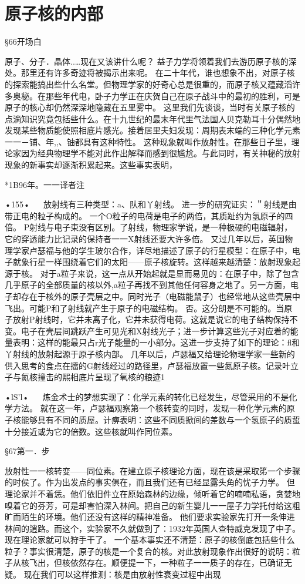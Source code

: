 \chapter{原子核的内部}

§66开场白

原子、分子．晶体..…现在又该讲什么呢？
益子力学将领着我们去游历原子核的深处。那里还有许多奇迹将被揭示出来呢。
在二十年代，谁也想象不出，对原子核的探索能搞出些什么名堂。但物理学家的好奇心总是很重的，而原子核又蕴藏滔许多奥秘。在那些年代电，卧子力学正在庆贺自己在原子战斗中的最初的胜利，可是原子的核心却仍然深深地隐藏在五里雾中。
这里我们先谈谈，当时有关原子核的点滴知识究竟包括些什么。在十九世纪的最末年代里气法国人贝克勒耳十分偶然地发现某些物质能使照相底片感光。接着居里夫妇发现：周期表末端的三种化学元素一一－铺、年,,、铀都具有这种特性。
这种现象就叫作放射性。在那些日子里，理论家因为经典物理学不能对此作出解释而感到很尴尬。与此同时，有关神秘的放射现象的新事实却逐渐积累起来。这些事实表明，

*1B96年。一一译者注

•155•
  
放射线有三种类型：a、队和丫射线。
进一步的研究证实：＂射线是由带正电的粒子构成的。
一个O粒子的电荷是电子的两倍，其质趾约为氢原子的四倍。
P射线与电子束没有区别。了射线，物理家学说，是一种极硬的电磁辐射，它的穿透能力比记录的保持者一一X射线还要大许多倍。
又过几年以后，英国物理学家卢瑟福与他的学生玻尔合作，详尽地描述了原子的行星模型：在原子中，电子就象行星一样围绕着它们的太阳——原子核旋转。这样越来越清楚：放射现象起源于核。
对于a粒子来说，这一点从开始起就是显而易见的：在原子中，除了包含几乎原子的全部质量的核以外,a粒子再找不到其他任何容身之地了。另一方面，电子却存在于核外的原子壳层之中。同时光子（电磁能鼠子）也经常地从这些壳层中飞出。可能P和了射线就产生于原子的电磁结构。
否。这分朗是不可能的。当原子放射P射线时，它并未离子化，它井未获得电荷。这就是说它的电子结构保持不变。电子在壳层间跳跃产生可见光和X射线光子；进一步计算这些光子对应着的能量表明：这样的能最只占r光子能量的一小部分。这进一步支持了如下的理论：fl和丫射线的放射起源于原子核内部。
几年以后，卢瑟福又给理论物理学家一些新的供入思考的食点在擂的G射线经过的路径里，卢瑟福放置一些氮原子核。记录叶立子与氮核撞击的熙相底片呈现了氧核的粮迹1

•lS'l•
  
炼金术士的梦想实现了：化学元素的转化已经发生，尽管采用的不是化学方法。
就在这一年，卢瑟福观察第一个核转变的同时，发现一种化学元素的原子核能够具有不同的质屋。计痹表明：这些不同质掀间的差数与一个氢原子的质蜇十分接近或为它的倍数。这些核就叫作同位素。

§67第一．步

放射性一一核转变——同位素。在建立原子核理论方面，现在该是采取笫一个步骤的时侯了。作为出发点的事实俱在，而且我们还有已经显露头角的忧子力学。
但理论家并不着恁。他们依旧件立在原始森林的边缘，倾听着它的喃喃私语，贪婪地嗅着它的芬芳，可是却害怕深入林间。把自己的新生婴儿一一屋子力学托付给这粗旷而陌生的环境。他们还没有这样的精神准备。
他们要求实验家先打开一条伸进林间的逍路。而这个，实验家不久就做到了：1932年英国人查特威克发现了中子。现在理论家就可以狩手干了。
一个基本事实还不清楚：原子的核倒底包括些什么粒子？事实很清楚，原子的核是一个复合的核。对此放射现象作出很好的说明：粒子从核飞出，但核依然存在。顺便提一下，一种粒子一一质子的存在，已确证无疑。
现在我们可以这样推测：核是由放射性衰变过程中出现

